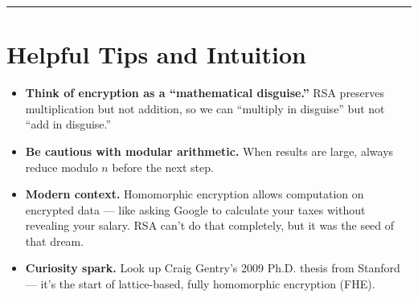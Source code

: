 \documentclass[12pt]{article}
\begin{document}
\bigskip
\hrule
\vspace{0.5em}

\section*{Helpful Tips and Intuition}

\begin{itemize}
  \item \textbf{Think of encryption as a “mathematical disguise.”} RSA preserves multiplication but not addition, so we can “multiply in disguise” but not “add in disguise.”
  \item \textbf{Be cautious with modular arithmetic.} When results are large, always reduce modulo $n$ before the next step.
  \item \textbf{Modern context.} Homomorphic encryption allows computation on encrypted data — like asking Google to calculate your taxes without revealing your salary. RSA can’t do that completely, but it was the seed of that dream.
  \item \textbf{Curiosity spark.} Look up Craig Gentry’s 2009 Ph.D. thesis from Stanford — it’s the start of lattice-based, fully homomorphic encryption (FHE).
\end{itemize}
\end{document}
